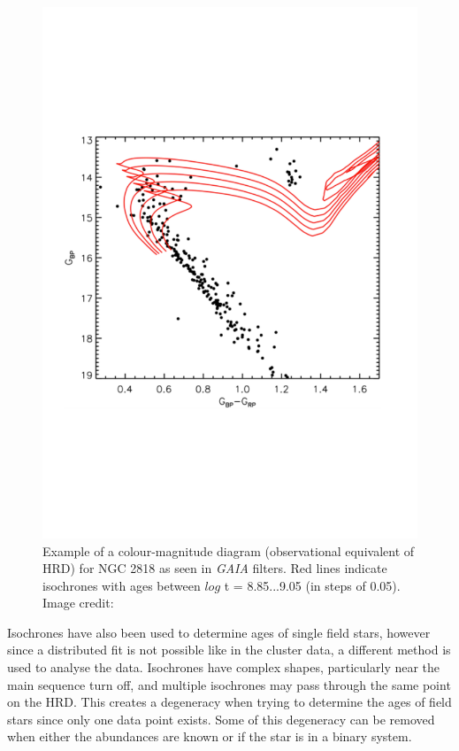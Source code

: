 \begin{figure}
    \centering
    \includegraphics[scale=0.45]{Figures/1-Introduction/gaia_OC_example.pdf}
    \caption[Example of colour-magnitude diagram for a cluster used to fit isochrones]{Example of a colour-magnitude diagram (observational equivalent of HRD) for NGC 2818 as seen in \textit{GAIA} filters. Red lines indicate isochrones with ages between $log$ t = 8.85...9.05 (in steps of 0.05). Image credit: \citet{Bastian_etal_2018}}
    \label{fig:OC_isochrone_example}
\end{figure}

Isochrones have also been used to determine ages of single field stars, however since a distributed fit is not possible like in the cluster data, a different method is used to analyse the data. Isochrones have complex shapes, particularly near the main sequence turn off, and multiple isochrones may pass through the same point on the HRD. This creates a degeneracy when trying to determine the ages of field stars since only one data point exists. Some of this degeneracy can be removed when either the abundances are known or if the star is in a binary system.

